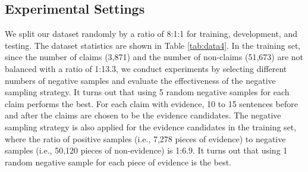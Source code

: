 \documentclass[11pt]{article}
\begin{document}
\subsection{Experimental Settings}
\begin{table}[t!]
	\centering
{}
\caption{Dataset statistics split on train/dev/test sets.}
	\label{tab:data4}
\end{table}

We split our dataset randomly by a ratio of 8:1:1 for training, development, and testing.
The dataset statistics are shown in Table \ref{tab:data4}.
In the training set, since the number of claims (3,871) and the number of non-claims (51,673) are not balanced with a ratio of 1:13.3, we conduct experiments by selecting different numbers of negative samples and evaluate the effectiveness of the negative sampling strategy. It turns out that using 5 random negative samples for each claim performs the best.
For each claim with evidence, 10 to 15 sentences before and after the claims are chosen to be the evidence candidates.
The negative sampling strategy is also applied for the evidence candidates in the training set, where the ratio of positive samples (i.e., 7,278 pieces of evidence) to negative samples (i.e., 50,120 pieces of non-evidence) is 1:6.9. 
It turns out that using 1 random negative sample for each piece of evidence is the best. 
\end{document}
